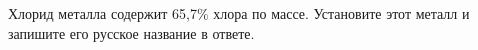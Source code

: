 
Хлорид металла содержит 65,7$\%$ хлора по массе. Установите этот металл и запишите его русское название в ответе.



